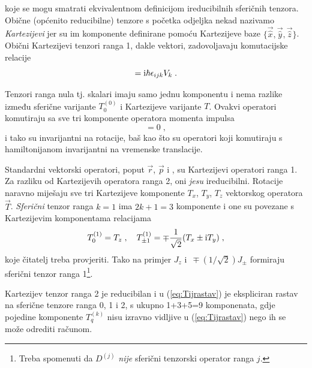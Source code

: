 koje se mogu smatrati ekvivalentnom
definicijom ireducibilnih sferičnih tenzora. 
Obične (općenito reducibilne) tenzore s početka odjeljka nekad
nazivamo \emph{Kartezijevi} jer su im komponente definirane pomoću Kartezijeve
baze $\{\vec{\hat{x}}, \vec{\hat{y}}, \vec{\hat{z}}\}$.
Obični Kartezijevi tenzori ranga 1, dakle vektori, zadovoljavaju komutacijske
relacije
\begin{equation}
 [J_i, V_j] = \rmi \hbar \epsilon_{ijk} V_k \;.
 \label{eq:jvkomutacija}
\end{equation}
\begin{primjer}
Tenzori ranga nula tj. skalari imaju samo jednu komponentu
i nema razlike između sferične varijante $T^{(0)}_0$ i Kartezijeve varijante $T$.
Ovakvi operatori komutiraju sa sve tri komponente operatora momenta impulsa
\begin{equation}
    [J_i, T] = 0 \;,
\end{equation}
i tako su invarijantni na rotacije, baš kao što su operatori
koji komutiraju s hamiltonijanom invarijantni na vremenske translacije.
\end{primjer}
\begin{primjer}
    Standardni vektorski operatori, poput $\vec{r}$, $\vec{p}$ i
    , su Kartezijevi operatori ranga 1. Za razliku od
    Kartezijevih operatora ranga 2, oni \emph{jesu} ireducibilni.
    Rotacije naravno miješaju sve tri Kartezijeve komponente
    $T_x$, $T_y$, $T_z$ vektorskog operatora $\vec{T}$. 
    \emph{Sferični} tenzor ranga $k=1$ ima $2k+1=3$ komponente i
    one su povezane s Kartezijevim komponentama relacijama
    \begin{equation}
    T^{(1)}_0 = T_z \;, \quad T^{(1)}_{\pm 1} = \mp \frac{1}{\sqrt{2}}
    (T_x \pm \textrm{i} T_y) \;,
    \label{eq:kartvektor}
    \end{equation}
    koje čitatelj treba provjeriti.
    Tako na primjer $J_z$ i $\,\mp (1/\sqrt{2})J_\pm$ formiraju sferični tenzor 
    ranga 1\footnote{Treba spomenuti da $D^{(j)}$ \emph{nije} 
    sferični tenzorski operator ranga $j$.}.
\end{primjer}
\begin{primjer}
    Kartezijev tenzor ranga 2 je reducibilan i u (\ref{eq:Tijrastav}) je ekspliciran
    rastav na sferične tenzore ranga 0, 1 i 2, s ukupno 1+3+5=9 komponenata,
    gdje pojedine komponente $T^{(k)}_q$ nisu izravno vidljive u (\ref{eq:Tijrastav}) 
    nego ih se može odrediti računom.
\end{primjer}


